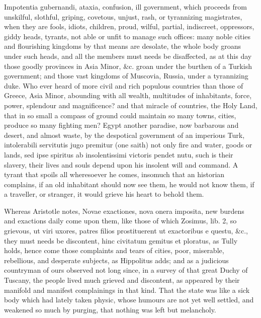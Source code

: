 {Impotentia gubernandi, ataxia, confusion, ill government, which
proceeds from unskilful, slothful, griping, covetous, unjust, rash, or
tyrannizing magistrates, when they are fools, idiots, children, proud,
wilful, partial, indiscreet, oppressors, giddy heads, tyrants, not able
or unfit to manage such offices: many noble cities and flourishing
kingdoms by that means are desolate, the whole body groans under such
heads, and all the members must needs be disaffected, as at this day
those goodly provinces in Asia Minor, \&c. groan under the burthen of a
Turkish government; and those vast kingdoms of Muscovia, Russia,
under a tyrannizing duke. Who ever heard of more civil and rich
populous countries than those of Greece, Asia Minor, abounding with all
wealth, multitudes of inhabitants, force, power, splendour and
magnificence? and that miracle of countries, the Holy Land, that
in so small a compass of ground could maintain so many towns, cities,
produce so many fighting men? Egypt another paradise, now barbarous and
desert, and almost waste, by the despotical government of an imperious
Turk, intolerabili servitutis jugo premitur (one saith) not only
fire and water, goods or lands, sed ipse spiritus ab insolentissimi
victoris pendet nutu, such is their slavery, their lives and souls
depend upon his insolent will and command. A tyrant that spoils all
wheresoever he comes, insomuch that an historian complains, if an
old inhabitant should now see them, he would not know them, if a
traveller, or stranger, it would grieve his heart to behold them.

Whereas Aristotle notes, Novae exactiones, nova onera imposita,
new burdens and exactions daily come upon them, like those of which
Zosimus, lib. 2, so grievous, ut viri uxores, patres filios
prostituerent ut exactoribus e questu, \&c., they must needs be
discontent, hinc civitatum gemitus et ploratus, as  Tully holds,
hence come those complaints and tears of cities, poor, miserable,
rebellious, and desperate subjects, as Hippolitus adds; and
as a judicious countryman of ours observed not long since, in a
survey of that great Duchy of Tuscany, the people lived much grieved
and discontent, as appeared by their manifold and manifest complainings
in that kind. That the state was like a sick body which had lately
taken physic, whose humours are not yet well settled, and weakened so
much by purging, that nothing was left but melancholy.

}
